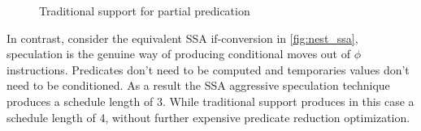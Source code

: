 \begin{figure}
\centering
\caption{Traditional support for partial predication}
\label{fig:trad_part_pred}
\end{figure}

In contrast, consider the equivalent SSA if-conversion in \ref{fig:nest_ssa}, speculation is the genuine way of producing conditional moves out of $\phi$ instructions. Predicates don't need to be computed and temporaries values don't need to be conditioned. As a result the SSA aggressive speculation technique produces a schedule length of 3. While traditional support produces in this case a schedule length of 4, without further expensive predicate reduction optimization.


